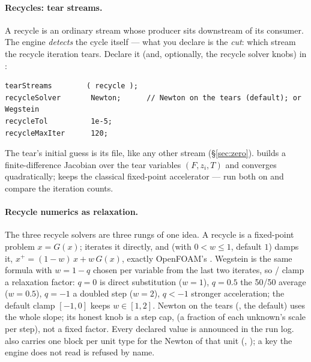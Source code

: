 \documentclass[11pt,a4paper]{article}
\begin{document}
\paragraph{Recycles: tear streams.}  A recycle is an ordinary stream
whose producer sits downstream of its consumer.  The engine
\emph{detects} the cycle itself --- what you declare is the \emph{cut}:
which stream the recycle iteration tears.  Declare it (and, optionally,
the recycle solver knobs) in :

\begin{lstlisting}[language=dict]
tearStreams        ( recycle );
recycleSolver       Newton;      // Newton on the tears (default); or Wegstein
recycleTol          1e-5;
recycleMaxIter      120;
\end{lstlisting}

The tear's initial guess is its  file, like any other stream
(\S\ref{sec:zero}).   builds a
finite-difference Jacobian over the tear variables $(F, z_i, T)$ and
converges quadratically;  keeps the classical
fixed-point accelerator --- run both on
 and compare the
iteration counts.

\paragraph{Recycle numerics as relaxation.}  The three recycle solvers
are three rungs of one idea.  A recycle is a fixed-point problem
$x = G(x)$;  iterates it
directly, and  (with $0 < w \le 1$, default
$1$) damps it, $x^{+} = (1-w)\,x + w\,G(x)$, exactly OpenFOAM's
.  Wegstein is the same formula with
$w = 1 - q$ chosen per variable from the last two iterates, so
/ clamp a relaxation factor:
$q = 0$ is direct substitution ($w = 1$), $q = 0.5$ the 50/50 average
($w = 0.5$), $q = -1$ a doubled step ($w = 2$), $q < -1$ stronger
acceleration; the default clamp $[-1, 0]$ keeps $w \in [1, 2]$.  Newton on the tears
(, the default) uses the whole slope; its
honest knob is a step cap,  (a fraction of each
unknown's scale per step), not a fixed factor.  Every declared value is
announced in the run log.   also carries one block per
unit type for the Newton of that unit
(, ); a key the
engine does not read is refused by name.
\end{document}
